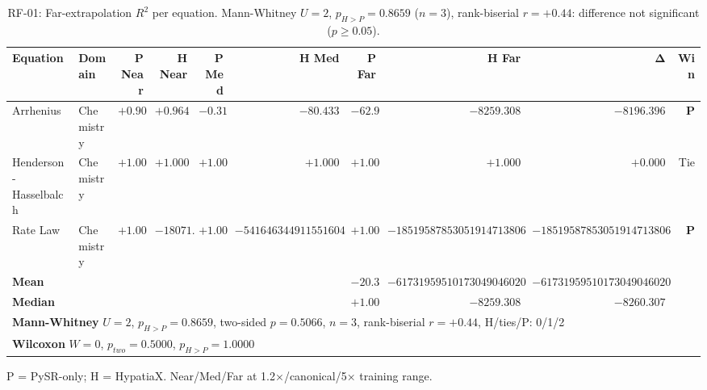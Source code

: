 \begin{table}[htbp]
\centering
\caption{RF-01: Far-extrapolation $R^2$ per equation. Mann-Whitney $U=2$, $p_{H>P}=0.8659$ ($n=3$), rank-biserial $r=+0.44$: difference not significant ($p\geq0.05$).}
\label{tab:rf01_significance}
\small
\begin{tabular}{llrrrrrrrr}
\toprule
\textbf{Equation} & \textbf{Domain} & \textbf{P Near} & \textbf{H Near} & \textbf{P Med} & \textbf{H Med} & \textbf{P Far} & \textbf{H Far} & $\boldsymbol{\Delta}$ & \textbf{Win} \\
\midrule
Arrhenius & Chemistry & $+0.908$ & $+0.964$ & $-0.319$ & $-80.433$ & $-62.912$ & $-8259.308$ & $-8196.396$ & \textbf{P} \\
Henderson-Hasselbalch & Chemistry & $+1.000$ & $+1.000$ & $+1.000$ & $+1.000$ & $+1.000$ & $+1.000$ & $+0.000$ & Tie \\
Rate Law & Chemistry & $+1.000$ & $-18071.498$ & $+1.000$ & $-54164634491155160486204188831776768.000$ & $+1.000$ & $-18519587853051914713806077427591725144592089088.000$ & $-18519587853051914713806077427591725144592089088.000$ & \textbf{P} \\
\midrule
\textbf{Mean} & & & & & & $-20.304$ & $-6173195951017304904602025809197241714864029696.000$ & $-6173195951017304904602025809197241714864029696.000$ & \\
\textbf{Median} & & & & & & $+1.000$ & $-8259.308$ & $-8260.307$ & \\
\midrule
\multicolumn{10}{l}{\textbf{Mann-Whitney} $U=2$, $p_{H>P}=0.8659$, two-sided $p=0.5066$, $n=3$, rank-biserial $r=+0.44$, H/ties/P: 0/1/2} \\
\multicolumn{10}{l}{\textbf{Wilcoxon} $W=0$, $p_{two}=0.5000$, $p_{H>P}=1.0000$} \\
\bottomrule
\end{tabular}
\begin{tablenotes}\small
\item P = PySR-only; H = HypatiaX. Near/Med/Far at 1.2×/canonical/5× training range.
\end{tablenotes}
\end{table}